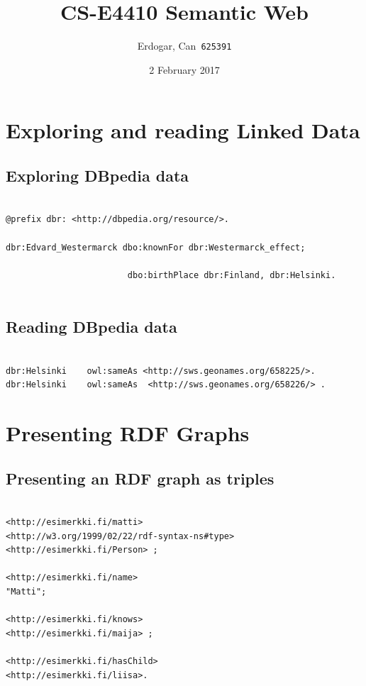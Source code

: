 \documentclass{article}
\title{CS-E4410 Semantic Web}
\author{
  Erdogar, Can\      \texttt{625391}
}
\date{ 2 February 2017}
\begin{document}
\maketitle

\section{Exploring and reading Linked Data}

\subsection{Exploring DBpedia data}

\begin{verbatim}

@prefix dbr: <http://dbpedia.org/resource/>.

dbr:Edvard_Westermarck dbo:knownFor dbr:Westermarck_effect;

						dbo:birthPlace dbr:Finland, dbr:Helsinki.
						
\end{verbatim}

\subsection{Reading DBpedia data}

\begin{verbatim}

dbr:Helsinki	owl:sameAs <http://sws.geonames.org/658225/>. 
dbr:Helsinki	owl:sameAs	<http://sws.geonames.org/658226/> . 

\end{verbatim}

\section{Presenting RDF Graphs}

\subsection{Presenting an RDF graph as triples}

\begin{verbatim}

<http://esimerkki.fi/matti>
<http://w3.org/1999/02/22/rdf-syntax-ns#type> 
<http://esimerkki.fi/Person> ;

<http://esimerkki.fi/name>
"Matti"; 

<http://esimerkki.fi/knows>
<http://esimerkki.fi/maija> ;

<http://esimerkki.fi/hasChild>
<http://esimerkki.fi/liisa>.

\end{verbatim}
\end{document}
